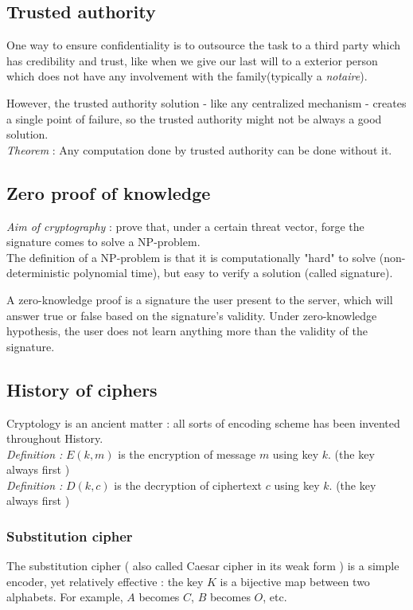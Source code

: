 \subsection{Trusted authority}

One way to ensure confidentiality is to outsource the task to a third party which has credibility and trust, like when we give our last will to a exterior person which does not have any involvement with the family(typically a \emph{notaire}).

However, the trusted authority solution - like any centralized mechanism -  creates a single point of failure, so the trusted authority might not be always a good solution. \\

\emph{Theorem} : Any computation done by trusted authority can be done without it.\\


\subsection{ Zero proof of knowledge }

\textit{Aim of cryptography} : prove that, under a certain threat vector, forge the signature comes to solve a NP-problem. \\

The definition of a NP-problem is that it is computationally "hard" to solve (non-deterministic polynomial time), but easy to verify a solution (called signature).

A zero-knowledge proof is a signature the user present to the server, which will answer true or false based on the signature's validity. Under zero-knowledge hypothesis, the user does not learn anything more than the validity of the signature.

\subsection{History of ciphers}

Cryptology is an ancient matter : all sorts of encoding scheme has been invented throughout History. \\


\emph{Definition :} $E(k,m)$ is the encryption of message $m$ using key $k$. (the key always first ) \\
\emph{Definition :} $D(k,c)$ is the decryption of ciphertext $c$ using key $k$. (the key always first ) 

\subsubsection{Substitution cipher }
The substitution cipher ( also called Caesar cipher in its weak form ) is a simple encoder, yet relatively effective : the key $K$ is a bijective map between two alphabets. For example, $A$ becomes $C$, $B$ becomes $O$, etc.\\

